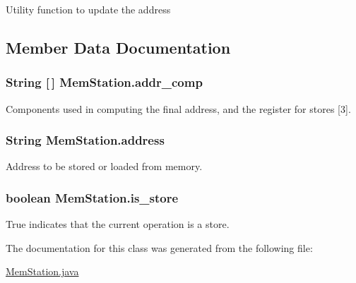 \-Utility function to update the address 

\subsection{\-Member \-Data \-Documentation}
\hypertarget{classMemStation_a26f6ed03957088b12aec6200cf9ccd1e}{
\subsubsection[{addr\-\_\-comp}]{\setlength{\rightskip}{0pt plus 5cm}\-String \mbox{[}$\,$\mbox{]} {\bf \-Mem\-Station.\-addr\-\_\-comp}}}\label{classMemStation_a26f6ed03957088b12aec6200cf9ccd1e}


\-Components used in computing the final address, and the register for stores \mbox{[}3\mbox{]}. 

\hypertarget{classMemStation_aeed8a623b07e146133976083b88ae513}{
\subsubsection[{address}]{\setlength{\rightskip}{0pt plus 5cm}\-String {\bf \-Mem\-Station.\-address}}}\label{classMemStation_aeed8a623b07e146133976083b88ae513}


\-Address to be stored or loaded from memory. 

\hypertarget{classMemStation_acc8a77b7441e35271230350677d71b8f}{
\subsubsection[{is\-\_\-store}]{\setlength{\rightskip}{0pt plus 5cm}boolean {\bf \-Mem\-Station.\-is\-\_\-store}}}\label{classMemStation_acc8a77b7441e35271230350677d71b8f}


\-True indicates that the current operation is a store. 



\-The documentation for this class was generated from the following file\-:\begin{DoxyCompactItemize}
\item 
\hyperlink{MemStation_8java}{\-Mem\-Station.\-java}\end{DoxyCompactItemize}
